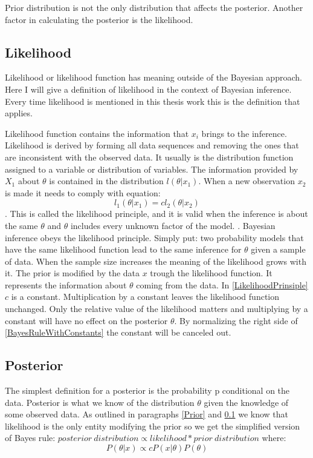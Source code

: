 Prior distribution is not the only distribution that affects the posterior. Another factor in calculating the posterior is the likelihood.

\subsection{Likelihood}\label{Likelihood}
Likelihood or likelihood function has meaning outside of the Bayesian approach. Here I will give a definition of likelihood in the context of Bayesian inference. Every time likelihood is mentioned in this thesis work this is the definition that applies. 

Likelihood function contains the information that $x_i$ brings to the inference. \cite{Robert2007TheBC} Likelihood is derived by forming all data sequences and removing the ones that are inconsistent with the observed data. It usually is the distribution function assigned to a variable or distribution of variables. \cite{Mcelreath2015StatisticalRA} The information provided by $X_1$ about $\theta$ is contained in the distribution $l(\theta|x_1)$. When a new observation $x_2$ is made it needs to comply with equation:
\begin{equation}\label{LikelihoodPrinsiple}
l_1(\theta|x_1) = cl_2(\theta|x_2)
\end{equation}
\cite{Robert2007TheBC}. This is called the likelihood principle, and it is valid when the inference is about the same $\theta$ and $\theta$ includes every unknown factor of the model. \cite{Robert2007TheBC}. Bayesian inference obeys the likelihood principle. Simply put: two probability models that have the same likelihood function lead to the same inference for $\theta$ given a sample of data.\cite{Gel2014BayesianDA}
When the sample size increases the meaning of the likelihood grows with it. \cite{Mcelreath2015StatisticalRA} The prior is modified by the data $x$ trough the likelihood function. It represents the information about $\theta$ coming from the data. In \ref{LikelihoodPrinsiple} $c$ is a constant. Multiplication by a constant leaves the likelihood function unchanged. Only the relative value of the likelihood matters and multiplying by a constant will have no effect on the posterior $\theta$. By normalizing the right side of \ref{BayesRuleWithConstants} the constant will be canceled out.\cite{Box1973BayesianII}
 
\subsection{Posterior}\label{Posterior}
The simplest definition for a posterior is the probability p conditional on the data.\cite{Mcelreath2015StatisticalRA} Posterior is what we know of the distribution $\theta$ given the knowledge of some observed data.
As outlined in paragraphs \ref{Prior} and \ref{Likelihood} we know that likelihood is the only entity modifying the prior so we get the simplified version of Bayes rule: $posterior\ distribution \propto likelihood * prior\ distribution$ where: 
\begin{equation}\label{BayesRuleWithConstants}
P(\theta|x) \propto cP(x|\theta)P(\theta)
\end{equation}\cite{Box1973BayesianII}

